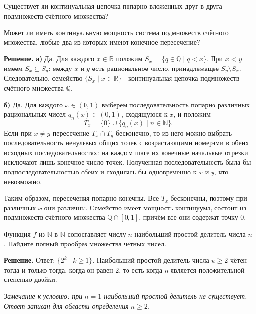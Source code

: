 \begin{problems}
\item
\begin{parts}
  \item Существует ли континуальная цепочка попарно вложенных друг в друга подмножеств счётного множества?
  \item Может ли иметь континуальную мощность система подмножеств счётного множества, любые два из которых имеют конечное пересечение?
\end{parts}
\par\smallskip\noindent\textbf{Решение.} \textbf{а)} Да. Для каждого $x\in\mathbb R$ положим $S_x=\{q\in\mathbb Q\mid q<x\}$. При $x<y$ имеем $S_x\subsetneq S_y$: между $x$ и $y$ есть рациональное число, принадлежащее $S_y\setminus S_x$. Следовательно, семейство $\{S_x\mid x\in\mathbb R\}$ - континуальная цепочка подмножеств счётного множества $\mathbb Q$.
\par\textbf{б)} Да. Для каждого $x\in(0,1)$ выберем последовательность попарно различных рациональных чисел $q_n(x)\in(0,1)$, сходящуюся к $x$, и положим
\[
T_x=\{0\}\cup\{q_n(x)\mid n\in\mathbb N\}.
\]
Если при $x\ne y$ пересечение $T_x\cap T_y$ бесконечно, то из него можно выбрать последовательность ненулевых общих точек с возрастающими номерами в обеих исходных последовательностях: на каждом шаге их конечные начальные отрезки исключают лишь конечное число точек. Полученная последовательность была бы подпоследовательностью обеих и сходилась бы одновременно к $x$ и $y$, что невозможно.
\par Таким образом, пересечения попарно конечны. Все $T_x$ бесконечны, поэтому при различных $x$ они различны. Семейство имеет мощность континуума, состоит из подмножеств счётного множества $\mathbb Q\cap[0,1]$, причём все они содержат точку $0$.\par

\item Функция $f$ из $\mathbb N$ в $\mathbb N$ сопоставляет числу $n$ наибольший простой делитель числа $n$. Найдите полный прообраз множества чётных чисел.
\par\smallskip\noindent\textbf{Решение.} Ответ: $\{2^k\mid k\ge1\}$. Наибольший простой делитель числа $n\ge2$ чётен тогда и только тогда, когда он равен $2$, то есть когда $n$ является положительной степенью двойки.
\par\textit{Замечание к условию: при $n=1$ наибольший простой делитель не существует. Ответ записан для области определения $n\ge2$.}\par


\end{problems}
